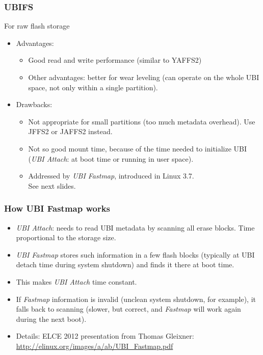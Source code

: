 \begin{frame}
\frametitle{UBIFS}
For raw flash storage
\begin{itemize}
\item Advantages:
      \begin{itemize}
      \item Good read and write performance (similar to YAFFS2)
      \item Other advantages: better for wear leveling (can operate on the
      	    whole UBI space, not only within a single partition).
      \end{itemize}
\item Drawbacks:
      \begin{itemize}
      \item Not appropriate for small partitions (too much metadata
   	    overhead). Use JFFS2 or JAFFS2 instead.
      \item Not so good mount time, because of the time needed
            to initialize UBI ({\em UBI Attach}: at boot time or running
             in user space).
      \item Addressed by {\em UBI Fastmap}, introduced in Linux 3.7. \\
            See next slides.
      \end{itemize}
\end{itemize}
\end{frame}

\begin{frame}
\frametitle{How UBI Fastmap works}
\begin{itemize}
\item {\em UBI Attach}: needs to read UBI metadata by
      scanning all erase blocks. Time proportional
      to the storage size.
\item {\em UBI Fastmap} stores such information in a few flash
      blocks (typically at UBI detach time during system
      shutdown) and finds it there at boot time.
\item This makes {\em UBI Attach} time constant.
\item If {\em Fastmap} information is invalid (unclean system
      shutdown, for example), it falls back to scanning
      (slower, but correct, and {\em Fastmap} will work again
      during the next boot).
\item Details: ELCE 2012 presentation from Thomas Gleixner:
      \url{http://elinux.org/images/a/ab/UBI_Fastmap.pdf}
\end{itemize}
\end{frame}


